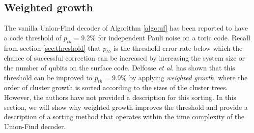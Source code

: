 \subsection{Weighted growth}\label{sec:bucketclustersort}
The vanilla Union-Find decoder of Algorithm \ref{algo:uf} has been reported to have a code threshold of $p_{th}=9.2\%$ for independent Pauli noise \cite{delfosse2017almost} on a toric code. Recall from section \ref{sec:threshold} that $p_{th}$ is the threshold error rate below which the chance of successful correction can be increased by increasing the system size or the number of qubits on the surface code. Delfosse \emph{et al.} has shown that this threshold can be improved to $p_{th}=9.9\%$ by applying \emph{weighted growth}, where the order of cluster growth is sorted according to the sizes of the cluster trees. However, the authors have not provided a description for this sorting. In this section, we will show why weighted growth improves the threshold and provide a description of a sorting method that operates within the time complexity of the Union-Find decoder. 




